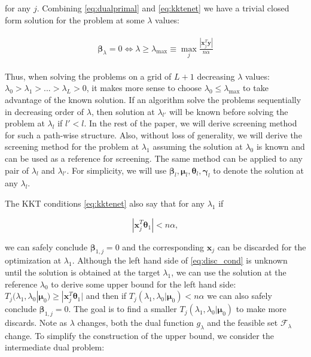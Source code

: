 for any $j$. Combining \eqref{eq:dualprimal} and \eqref{eq:kktenet} we have a trivial closed form solution for the problem at some $\lambda$ values:

\begin{gather}
    \label{eq:lammax}
    \begin{aligned}
        \boldsymbol\beta_\lambda=0\iff \lambda \geq \lambda_{\max}\equiv \max_j \frac{|\boldsymbol x_j^T\boldsymbol y|}{n\alpha}
    \end{aligned}
\end{gather}

Thus, when solving the problems on a grid of $L+1$ decreasing $\lambda$ values: $\lambda_0>\lambda_1>...>\lambda_L>0$, it makes more sense to choose $\lambda_0\leq\lambda_{\max}$ to take advantage of the known solution. If an algorithm solve the problems sequentially in decreasing order of $\lambda$, then solution at $\lambda_{l'}$ will be known before solving the problem at $\lambda_l$ if $l'<l$. In the rest of the paper, we will derive screening method for such a path-wise structure. Also, without loss of generality, we will derive the screening method for the problem at $\lambda_1$ assuming the solution at $\lambda_0$ is known and can be used as a reference for screening. The same method can be applied to any pair of $\lambda_{l}$ and $\lambda_{l'}$. For simplicity, we will use $\boldsymbol\beta_l,\boldsymbol\mu_l,\boldsymbol\theta_l,\boldsymbol\gamma_l$ to denote the solution at any $\lambda_l$.

The KKT conditions \eqref{eq:kktenet} also say that for any $\lambda_1$ if 

\begin{equation}
    \label{eq:disc_cond}
    |\boldsymbol x_j^T\boldsymbol\theta_{1}|<n\alpha,
\end{equation}

we can safely conclude $\boldsymbol\beta_{1,j}=0$ and the corresponding $\boldsymbol x_j$ can be discarded for the optimization at $\lambda_1$. Although the left hand side of \eqref{eq:disc_cond} is unknown until the solution is obtained at the target $\lambda_1$, we can use the solution at the reference $\lambda_{0}$ to derive some upper bound for the left hand side: $T_j(\lambda_{1},\lambda_{0}|\boldsymbol\mu_0)\geq |\boldsymbol x_j^T\boldsymbol\theta_1|$ and then if $T_j(\lambda_{1},\lambda_{0}|\boldsymbol\mu_0)<n\alpha$ we can also safely conclude $\boldsymbol\beta_{1,j}=0$. The goal is to find a smaller $T_j(\lambda_{1},\lambda_{0}|\boldsymbol\mu_0)$ to make more discards. Note as $\lambda$ changes, both the dual function $g_\lambda$ and the feasible set $\mathcal{F}_\lambda$ change. To simplify the construction of the upper bound, we consider the intermediate dual problem:

